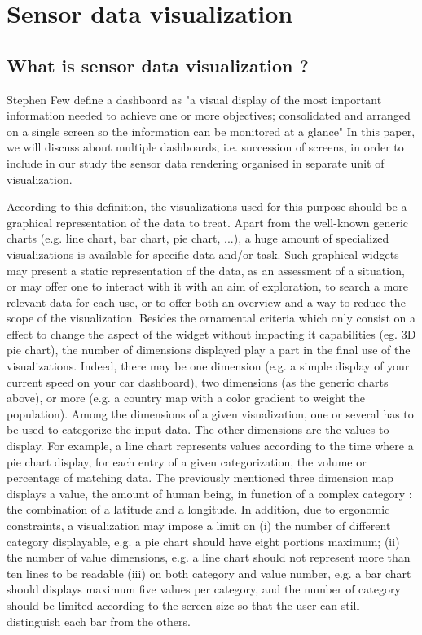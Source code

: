 \section{Sensor data visualization}


\subsection{What is sensor data visualization ?}

Stephen Few define a dashboard as "a visual display of the most
important information needed to achieve one or more objectives;
consolidated and arranged on a single screen so the information can be
monitored at a glance"\cite{few:dashboard} In this paper, we will
discuss about multiple dashboards, i.e. succession of screens, in
order to include in our study the sensor data rendering organised in
separate unit of visualization.

According to this definition, the visualizations used for this purpose
should be a graphical representation of the data to treat. Apart from
the well-known generic charts (e.g. line chart, bar chart, pie chart,
...), a huge amount of specialized visualizations is available for
specific data and/or task.
Such graphical widgets may present a static representation of the
data, as an assessment of a situation, or may offer one to interact
with it with an aim of exploration, to search a more relevant data for
each use, or to offer both an overview and a way to reduce the scope
of the visualization.
Besides the ornamental criteria which only consist on a effect to
change the aspect of the widget without impacting it capabilities
(eg. 3D pie chart), the number of dimensions displayed play a part in
the final use of the visualizations.  Indeed, there may be one
dimension (e.g. a simple display of your current speed on your car
dashboard), two dimensions (as the generic charts above), or more
(e.g. a country map with a color gradient to weight the population).
Among the dimensions of a given visualization, one or several has to
be used to categorize the input data. The other dimensions are the
values to display.  For example, a line chart represents values
according to the time where a pie chart display, for each entry of a
given categorization, the volume or percentage of matching data. The
previously mentioned three dimension map displays a value, the amount
of human being, in function of a complex category : the combination of
a latitude and a longitude.  In addition, due to ergonomic
constraints, a visualization may impose a limit on (i) the number of
different category displayable, e.g. a pie chart should have eight
portions maximum; (ii) the number of value dimensions, e.g. a line
chart should not represent more than ten lines to be readable (iii) on
both category and value number, e.g. a bar chart should displays
maximum five values per category, and the number of category should be
limited according to the screen size so that the user can still
distinguish each bar from the others.

